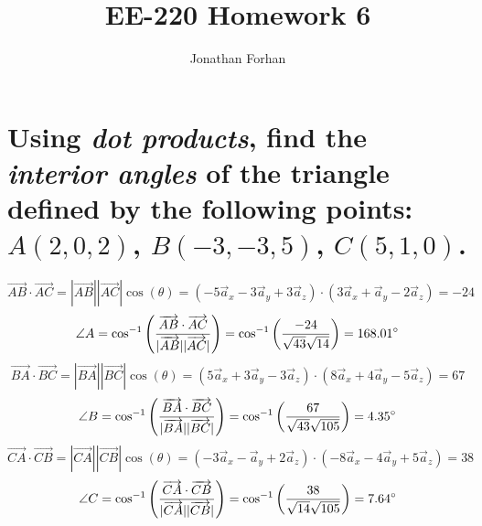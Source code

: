 \documentclass[14pt]{extarticle}
\title{EE-220 Homework 6}
\author{Jonathan Forhan}
\date{ }
\begin{document}
\maketitle

\boldmath
\section{Using \textit{dot products}, find the \textit{interior angles} of the triangle defined by the following points: \newline
  $A(2,0,2)$, $B(-3,-3,5)$, $C(5,1,0)$.}
\unboldmath{$ $}

\begin{center}
\end{center}
\[
	\overrightarrow{AB}\cdot\overrightarrow{AC}=|\overrightarrow{AB}||\overrightarrow{AC}|\cos(\theta)=
	\left(-5\vec{a}_x-3\vec{a}_y+3\vec{a}_z\right)\cdot\left(3\vec{a}_x+\vec{a}_y-2\vec{a}_z\right)=-24
\]
\[
	\angle{A}=\cos^{-1}\left(\frac{\overrightarrow{AB}\cdot\overrightarrow{AC}}{|\overrightarrow{AB}||\overrightarrow{AC}|}\right)=
	\cos^{-1}\left(\frac{-24}{\sqrt{43}\sqrt{14}}\right)=168.01\degree
\]
\[
	\overrightarrow{BA}\cdot\overrightarrow{BC}=|\overrightarrow{BA}||\overrightarrow{BC}|\cos(\theta)=
	\left(5\vec{a}_x+3\vec{a}_y-3\vec{a}_z\right)\cdot\left(8\vec{a}_x+4\vec{a}_y-5\vec{a}_z\right)=67
\]
\[
	\angle{B}=\cos^{-1}\left(\frac{\overrightarrow{BA}\cdot\overrightarrow{BC}}{|\overrightarrow{BA}||\overrightarrow{BC}|}\right)=
	\cos^{-1}\left(\frac{67}{\sqrt{43}\sqrt{105}}\right)=4.35\degree
\]
\[
	\overrightarrow{CA}\cdot\overrightarrow{CB}=|\overrightarrow{CA}||\overrightarrow{CB}|\cos(\theta)=
	\left(-3\vec{a}_x-\vec{a}_y+2\vec{a}_z\right)\cdot\left(-8\vec{a}_x-4\vec{a}_y+5\vec{a}_z\right)=38
\]
\[
	\angle{C}=\cos^{-1}\left(\frac{\overrightarrow{CA}\cdot\overrightarrow{CB}}{|\overrightarrow{CA}||\overrightarrow{CB}|}\right)=
	\cos^{-1}\left(\frac{38}{\sqrt{14}\sqrt{105}}\right)=7.64\degree
\]
\end{document}
